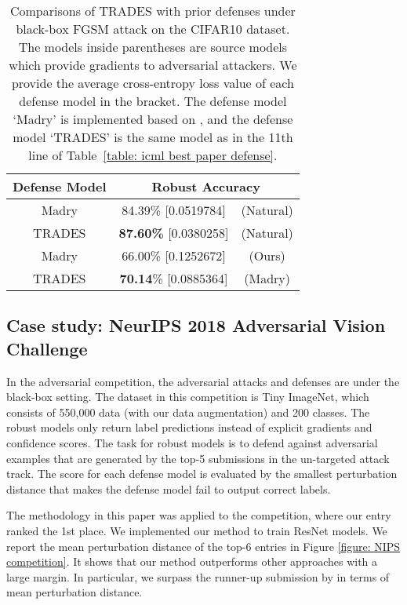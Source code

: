 \documentclass[11pt]{article}
\newcommand{\0}{\mathbf{0}}
\newcommand{\1}{\mathbf{1}}
\begin{document}
\vspace{-0.3cm}
\begin{table}
	\caption{Comparisons of TRADES with prior defenses under black-box FGSM attack on the CIFAR10 dataset. The models inside parentheses are source models which provide gradients to adversarial attackers.  We provide the average cross-entropy loss value of each defense model in the bracket. The defense model `Madry' is implemented based on \cite{madry2018towards}, and  the defense model `TRADES' is the same model as in the 11th line of Table~\ref{table: icml best paper defense}.}
	\vspace{+0.2cm}
	\label{table: CIFAR10 FGSM-20 black-box defense}
	\centering
\begin{tabular}{c||cc}\hline
Defense Model & \multicolumn{2}{c}{Robust Accuracy }
		\\
		\hline
		{Madry} & 84.39\% [0.0519784] & (Natural) \\ 
		\hline
		{TRADES} & \textbf{87.60\%} [0.0380258] & (Natural)  \\
		\hline
		{Madry} & 66.00\% [0.1252672]  &(Ours) \\ 
		\hline
		{TRADES} &  \textbf{70.14}\% [0.0885364] & (Madry)  \\
		\hline
\end{tabular}
\end{table}



\subsection{Case study: NeurIPS 2018 Adversarial Vision Challenge}

\medskip
{}
In the adversarial competition, the adversarial attacks and defenses are under the black-box setting. The dataset in this competition is Tiny ImageNet, which consists of 550,000 data (with our data augmentation) and 200 classes. The robust models only return label predictions instead of explicit gradients and confidence scores.
The task for robust models is to defend against adversarial examples that are generated by the top-5 submissions in the un-targeted attack track. The score for each defense model is evaluated by the smallest perturbation distance that makes the defense model fail to output correct labels.

\medskip
{}
The methodology in this paper was applied to the competition, where our entry ranked the 1st place. We implemented our method to train ResNet models.
We report the mean  perturbation distance of the top-6 entries in Figure \ref{figure: NIPS competition}. It shows that our method outperforms other approaches with a large margin. In particular, we surpass the runner-up submission by  in terms of mean  perturbation distance.
\end{document}
